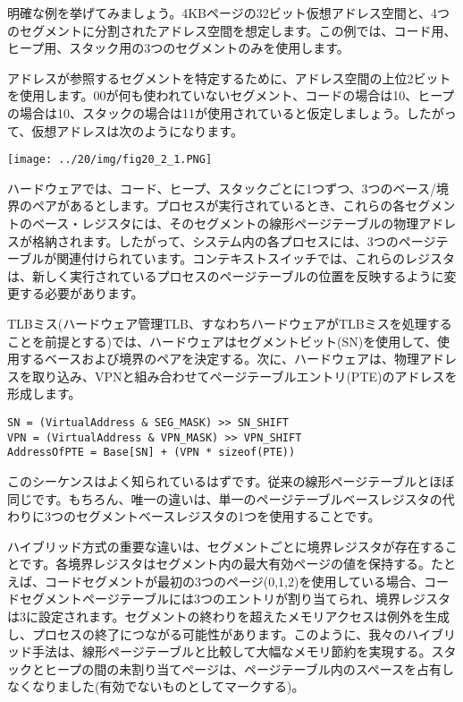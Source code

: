 明確な例を挙げてみましょう。4KBページの32ビット仮想アドレス空間と、4つのセグメントに分割されたアドレス空間を想定します。この例では、コード用、ヒープ用、スタック用の3つのセグメントのみを使用します。

アドレスが参照するセグメントを特定するために、アドレス空間の上位2ビットを使用します。00が何も使われていないセグメント、コードの場合は10、ヒープの場合は10、スタックの場合は11が使用されていると仮定しましょう。したがって、仮想アドレスは次のようになります。

\texttt{[image: ../20/img/fig20\_2\_1.PNG]}

ハードウェアでは、コード、ヒープ、スタックごとに1つずつ、3つのベース/境界のペアがあるとします。プロセスが実行されているとき、これらの各セグメントのベース・レジスタには、そのセグメントの線形ページテーブルの物理アドレスが格納されます。したがって、システム内の各プロセスには、3つのページテーブルが関連付けられています。コンテキストスイッチでは、これらのレジスタは、新しく実行されているプロセスのページテーブルの位置を反映するように変更する必要があります。

TLBミス(ハードウェア管理TLB、すなわちハードウェアがTLBミスを処理することを前提とする)では、ハードウェアはセグメントビット(SN)を使用して、使用するベースおよび境界のペアを決定する。次に、ハードウェアは、物理アドレスを取り込み、VPNと組み合わせてページテーブルエントリ(PTE)のアドレスを形成します。

\begin{verbatim}
SN = (VirtualAddress & SEG_MASK) >> SN_SHIFT
VPN = (VirtualAddress & VPN_MASK) >> VPN_SHIFT
AddressOfPTE = Base[SN] + (VPN * sizeof(PTE))
\end{verbatim}

このシーケンスはよく知られているはずです。従来の線形ページテーブルとほぼ同じです。もちろん、唯一の違いは、単一のページテーブルベースレジスタの代わりに3つのセグメントベースレジスタの1つを使用することです。

ハイブリッド方式の重要な違いは、セグメントごとに境界レジスタが存在することです。各境界レジスタはセグメント内の最大有効ページの値を保持する。たとえば、コードセグメントが最初の3つのページ(0,1,2)を使用している場合、コードセグメントページテーブルには3つのエントリが割り当てられ、境界レジスタは3に設定されます。セグメントの終わりを超えたメモリアクセスは例外を生成し、プロセスの終了につながる可能性があります。このように、我々のハイブリッド手法は、線形ページテーブルと比較して大幅なメモリ節約を実現する。スタックとヒープの間の未割り当てページは、ページテーブル内のスペースを占有しなくなりました(有効でないものとしてマークする)。

